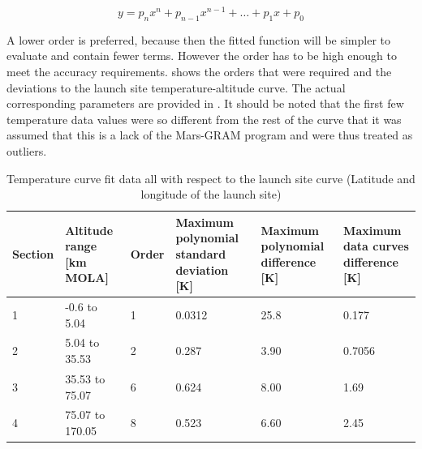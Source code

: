 \begin{equation} \label{eq:polyGenFunct}
y=p_{n}x^{n}+p_{n-1}x^{n-1}+\dots+p_{1}x+p_{0}
\end{equation}

A lower order is preferred, because then the fitted function will be simpler to evaluate and contain fewer terms. However the order has to be high enough to meet the accuracy requirements.  shows the orders that were required and the deviations to the launch site temperature-altitude curve. The actual corresponding parameters are provided in . It should be noted that the first few temperature data values were so different from the rest of the curve that it was assumed that this is a lack of the Mars-\ac{GRAM} program and were thus treated as outliers.

\begin{table}[!ht]
\begin{center}
\caption{Temperature curve fit data all with respect to the launch site curve (Latitude and longitude of the launch site)}
\label{tab:fitDeviations}
\begin{tabular}{|l|l|l|p{3cm}|p{3cm}|p{3cm}|}
\hline 
\textbf{Section} & \textbf{Altitude range [km MOLA]} & \textbf{Order}	& \textbf{Maximum polynomial standard deviation [K]} & \textbf{Maximum polynomial difference [K]} & \textbf{Maximum data curves difference [K]} \\ \hline 
1 & -0.6 to 5.04 & 1 & 0.0312 & 25.8 & 0.177 \\ \hline
2 & 5.04 to 35.53 & 2 & 0.287 & 3.90 & 0.7056 \\ \hline
3 & 35.53 to 75.07 & 6 & 0.624 & 8.00 & 1.69 \\ \hline
4 & 75.07 to 170.05 & 8 & 0.523 & 6.60 & 2.45 \\ \hline
\end{tabular}
\end{center}
\end{table}

